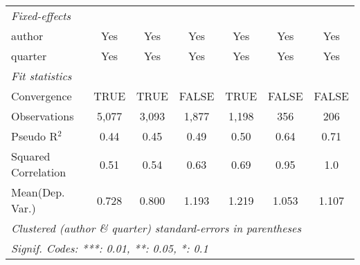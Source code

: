 \begin{tabular}{lcccccc}
   \midrule
   \emph{Fixed-effects}\\
   author                                                     & Yes           & Yes           & Yes           & Yes           & Yes              & Yes\\  
   quarter                                                    & Yes           & Yes           & Yes           & Yes           & Yes              & Yes\\  
   \midrule
   \emph{Fit statistics}\\
   Convergence                                                &TRUE           & TRUE          & FALSE         & TRUE          & FALSE            & FALSE\\  
   Observations                                               & 5,077         & 3,093         & 1,877         & 1,198         & 356              & 206\\  
   Pseudo R$^2$                                               & 0.44          & 0.45          & 0.49          & 0.50          & 0.64             & 0.71\\  
   Squared Correlation                                        & 0.51          & 0.54          & 0.63          & 0.69          & 0.95             & 1.0\\  
Mean(Dep. Var.) & 0.728 & 0.800 & 1.193 & 1.219 & 1.053 & 1.107 \\
   \midrule \midrule
   \multicolumn{7}{l}{\emph{Clustered (author \& quarter) standard-errors in parentheses}}\\
   \multicolumn{7}{l}{\emph{Signif. Codes: ***: 0.01, **: 0.05, *: 0.1}}\\
\end{tabular}
\par\endgroup
